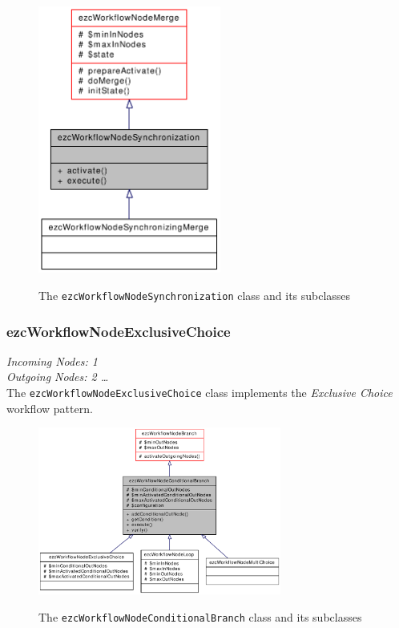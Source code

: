 \begin{figure}[hbt]
\begin{center}
\includegraphics[width=6cm]{figures/WorkflowNodeSynchronization}\\[5mm]
\end{center}
\caption{The \texttt{ezcWorkflowNodeSynchronization} class and its subclasses}
\label{classezcWorkflowNodeSynchronization}
\end{figure}

\subsubsection{ezcWorkflowNodeExclusiveChoice}

\emph{Incoming Nodes: 1}\\
\emph{Outgoing Nodes: 2 \dots *}\\

The \texttt{ezcWorkflowNodeExclusiveChoice} class implements the
\emph{Exclusive Choice} workflow pattern.

\begin{figure}[hbt]
\begin{center}
\includegraphics[width=8cm]{figures/WorkflowNodeConditionalBranch}\\[5mm]
\end{center}
\caption{The \texttt{ezcWorkflowNodeConditionalBranch} class and its subclasses}
\label{classezcWorkflowNodeConditionalBranch}
\end{figure}

